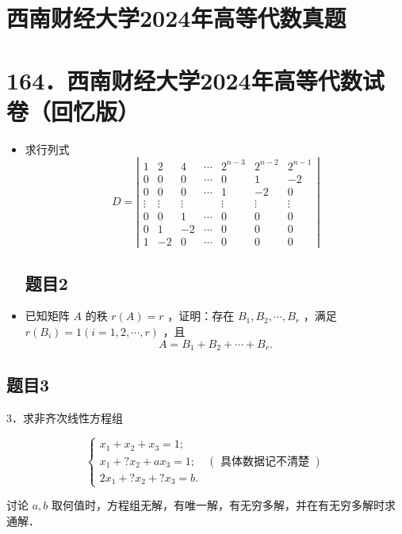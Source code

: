 \documentclass{article}
\begin{document}
\section*{西南财经大学2024年高等代数真题}
\section*{164．西南财经大学2024年高等代数试卷（回忆版）}
\begin{itemize}

\subsection{题目1}
  \item[1．] 求行列式
\[
D=\left|\begin{array}{ccccccc}
1 & 2 & 4 & \cdots & 2^{n-3} & 2^{n-2} & 2^{n-1} \\
0 & 0 & 0 & \cdots & 0 & 1 & -2 \\
0 & 0 & 0 & \cdots & 1 & -2 & 0 \\
\vdots & \vdots & \vdots & & \vdots & \vdots & \vdots \\
0 & 0 & 1 & \cdots & 0 & 0 & 0 \\
0 & 1 & -2 & \cdots & 0 & 0 & 0 \\
1 & -2 & 0 & \cdots & 0 & 0 & 0
\end{array}\right|
\]

\subsection{题目2}
  \item[2．] 已知矩阵 \(A\) 的秩 \(r(A)=r\) ，证明：存在 \(B_{1}, B_{2}, \cdots, B_{r}\) ，满足 \(r\left(B_{i}\right)=1(i=1,2, \cdots, r)\) ，且
\[
A=B_{1}+B_{2}+\cdots+B_{r} .
\]
\end{itemize}

\subsection{题目3}
3．求非齐次线性方程组

\[
\left\{\begin{array}{l}
x_{1}+x_{2}+x_{3}=1 ; \\
x_{1}+? x_{2}+a x_{3}=1 ; \quad(\text { 具体数据记不清楚 }) \\
2 x_{1}+? x_{2}+? x_{3}=b .
\end{array}\right.
\]

讨论 \(a, b\) 取何值时，方程组无解，有唯一解，有无穷多解，并在有无穷多解时求通解．
\end{document}
